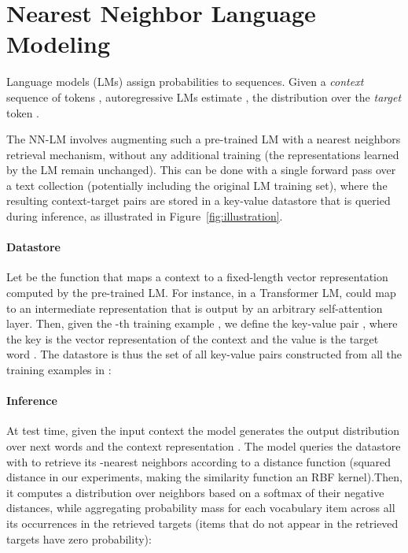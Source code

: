 \documentclass{article} \usepackage{iclr2020_conference,times}
\begin{document}
\section{Nearest Neighbor Language Modeling}
\label{sec:model}

Language models (LMs) assign probabilities to sequences. Given a \emph{context}  sequence of tokens , autoregressive LMs estimate , the distribution over the \emph{target} token .

The NN-LM involves augmenting such a pre-trained LM with a nearest neighbors retrieval mechanism, without any additional training (the representations learned by the LM remain unchanged).
This can be done with a single forward pass over a text collection (potentially including the original LM training set), where the resulting context-target pairs are stored in a key-value datastore that is queried during inference, as illustrated in Figure~\ref{fig:illustration}.

\paragraph{Datastore}
Let  be the function that maps a context  to a fixed-length vector representation computed by the pre-trained LM.
For instance, in a Transformer LM,  could map  to an intermediate representation that is output by an arbitrary self-attention layer. 
Then, given the -th training example , we define the key-value pair , where the key  is the vector representation of the context  and the value  is the target word .
The datastore  is thus the set of all key-value pairs constructed from all the training examples in :


\paragraph{Inference}
At test time, given the input context 
the model generates the output distribution over next words  and the context representation .
The model queries the datastore with  to retrieve its -nearest neighbors  according to a distance function  (squared  distance in our experiments, making the similarity function an RBF kernel).Then, it computes a distribution over neighbors based on a softmax of their negative distances, while aggregating probability mass for each vocabulary item across all its occurrences in the retrieved targets (items that do not appear in the retrieved targets have zero probability): 
\end{document}
